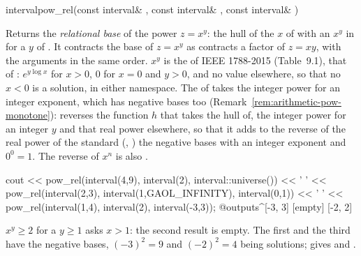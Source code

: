 \begin{deffun}{interval}{pow\_rel}{(const interval\& , const interval\& , const interval\& )}
  \begin{operation}
  \end{operation}
  Returns the \emph{relational base} of the power $z=x^y$: the hull of the
  $x$ of  with an $x^y$ in  for a $y$ of . It contracts
  the base of $z=x^y$ as  contracts a factor of
  $z=xy$, with the arguments in the same order.\newinvfive{} $x^y$ is the
   of IEEE 1788-2015 (Table~9.1), that of
  : $e^{y\log x}$ for $x>0$, $0$ for $x=0$ and
  $y>0$, and no value elsewhere, so that no $x<0$ is a solution, in either
  namespace. The  of  takes the integer power for an
  integer exponent, which has negative bases too
  (Remark~\ref{rem:arithmetic-pow-monotone}):  reverses the
  function $h$ that  takes the hull of, the integer power for an
  integer $y$ and that real power elsewhere, so that it adds to the reverse of
  the real power of the standard (, )
  the negative bases with an integer exponent and $0^0=1$. The reverse of
  $x^n$ is also .
\begin{example}
cout << pow_rel(interval(4,9), interval(2), interval::universe()) << ' '
     << pow_rel(interval(2,3), interval(1,GAOL_INFINITY), interval(0,1)) << ' '
     << pow_rel(interval(1,4), interval(2), interval(-3,3));
@outputs^[-3, 3] [empty] [-2, 2]~
\end{example}
  $x^y\geq2$ for a $y\geq1$ asks $x>1$: the second result is empty. The first
  and the third have the negative bases, $(-3)^2=9$ and $(-2)^2=4$ being
  solutions;  gives  and .
\end{deffun}


